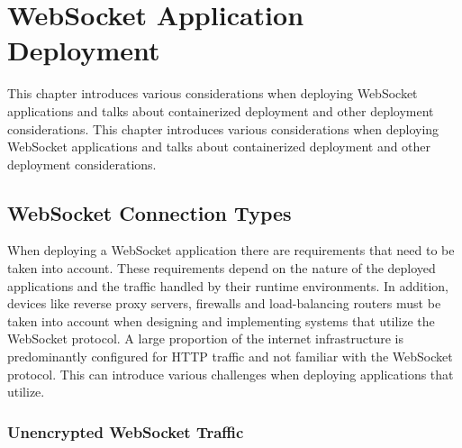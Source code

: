 \chapter{WebSocket Application Deployment}
\label{chapter:webSocketApplicationDeployment}

This chapter introduces various considerations when deploying WebSocket applications and talks about containerized deployment and other deployment considerations. This chapter introduces various considerations when deploying WebSocket applications and talks about containerized deployment and other deployment considerations.

\section{WebSocket Connection Types}

When deploying a WebSocket application there are requirements that need to be taken into account. These requirements depend on the nature of the deployed applications and the traffic handled by their runtime environments. In addition, devices like reverse proxy servers, firewalls and load-balancing routers must be taken into account when designing and implementing systems that utilize the WebSocket protocol. A large proportion of the internet infrastructure is predominantly configured for HTTP traffic and not familiar with the WebSocket protocol. This can introduce various challenges when deploying applications that utilize.

\subsection{Unencrypted WebSocket Traffic}

